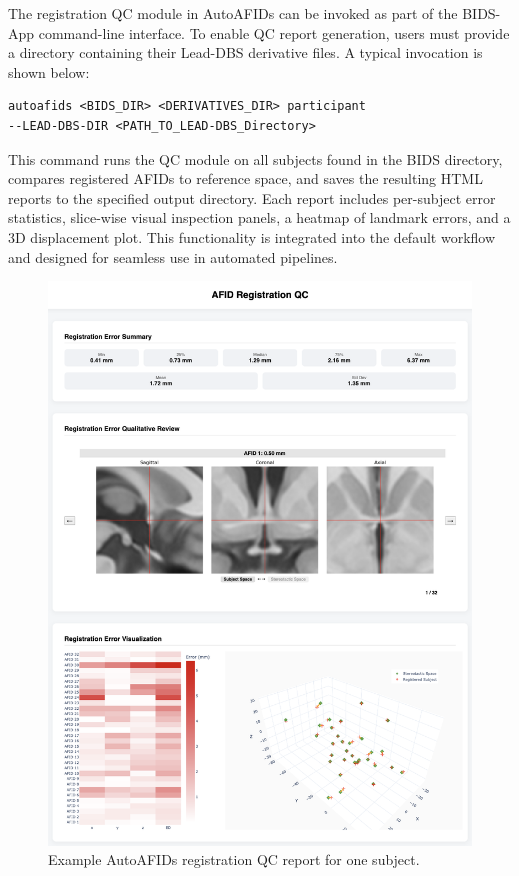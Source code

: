 The registration QC module in AutoAFIDs can be invoked as part of the BIDS-App command-line interface. To enable QC report generation, users must provide a directory containing their Lead-DBS derivative files. A typical invocation is shown below:

\begin{verbatim}
autoafids <BIDS_DIR> <DERIVATIVES_DIR> participant
--LEAD-DBS-DIR <PATH_TO_LEAD-DBS_Directory>
\end{verbatim}

This command runs the QC module on all subjects found in the BIDS directory, compares registered AFIDs to reference space, and saves the resulting HTML reports to the specified output directory. Each report includes per-subject error statistics, slice-wise visual inspection panels, a heatmap of landmark errors, and a 3D displacement plot. This functionality is integrated into the default workflow and designed for seamless use in automated pipelines.
\begin{figure}
    \centering
    \includegraphics[width=0.95\linewidth]{figs/figuresupregqc.png}
    \caption{Example AutoAFIDs registration QC report for one subject.}
    \label{fig:figuresupregqc}
\end{figure}
\newpage
